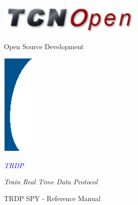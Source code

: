 \documentclass[a4paper]{book}
\newcommand{\clearemptydoublepage}{\newpage{\pagestyle{empty}\cleardoublepage}}
\newcommand{\+}{\kern0.05em}
\newcommand{\documentTitle}{TRDP SPY - Reference Manual}
\begin{document}
\hypersetup{pageanchor=false,citecolor=blue}

\begin{titlepage}
\pagestyle{empty}

\hspace{-1cm}
\begin{minipage}[c]{0.40\linewidth}
\includegraphics[width=7cm]{TCNOpen}
\end{minipage}
\hspace{3.0cm}
\begin{minipage}[c]{0.70\linewidth}
{\huge Open Source Development}
\end{minipage}

\vspace{2.5cm}

\begin{minipage}[c]{2cm}
\includegraphics[width=1.5cm]{blueTitleGraphic}
\end{minipage}
\hspace{0.0cm}
\begin{minipage}[c]{0.90\linewidth}
\textcolor{Blue}{\fontsize{80}{80} \selectfont \emph{TRDP}}

\vspace*{1.0cm}

{\fontsize{24}{24} \selectfont \emph{Train Real Time Data Protocol}}

\end{minipage}

\vspace*{1.0cm}

\begin{center}
{\fontsize{38}{38} \selectfont \documentTitle}\\
\vspace*{1cm}
\end{center}


\end{titlepage}

\pagestyle{fancy}

\clearemptydoublepage
{}
\tableofcontents
\clearemptydoublepage
{}
\hypersetup{pageanchor=true,citecolor=blue}
\end{document}
